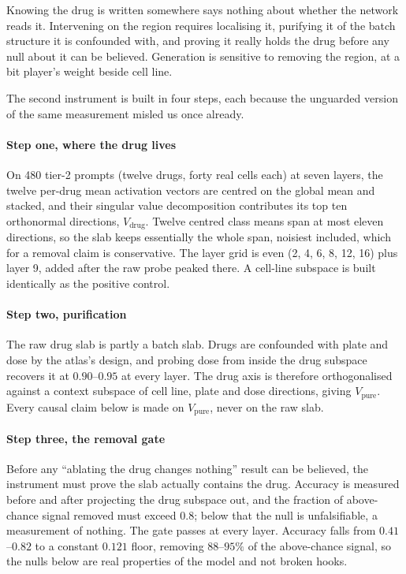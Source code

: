 \begin{question}[3]
Knowing the drug is written somewhere says nothing about whether the network
reads it. Intervening on the region requires localising it, purifying it of the
batch structure it is confounded with, and proving it really holds the drug
before any null about it can be believed. Generation is sensitive to removing the
region, at a bit player's weight beside cell line.
\end{question}

\noindent
The second instrument is built in four steps, each because the unguarded version
of the same measurement misled us once already.

\paragraph{Step one, where the drug lives} On \num{480} tier-2 prompts (twelve
drugs, forty real cells each) at seven layers, the twelve per-drug mean
activation vectors are centred on the global mean and stacked, and their singular
value decomposition contributes its top ten orthonormal directions,
$V_{\textrm{drug}}$. Twelve centred class means span at most eleven directions,
so the slab keeps essentially the whole span, noisiest included, which for a
removal claim is conservative. The layer grid is even (2, 4, 6, 8, 12, 16) plus
layer 9, added after the raw probe peaked there. A cell-line subspace is built
identically as the positive control.

\paragraph{Step two, purification} The raw drug slab is partly a batch slab.
Drugs are confounded with plate and dose by the atlas's design, and probing dose
from inside the drug subspace recovers it at $0.90$--$0.95$ at every layer. The
drug axis is therefore orthogonalised against a context subspace of cell line,
plate and dose directions, giving $V_{\textrm{pure}}$. Every causal claim below
is made on $V_{\textrm{pure}}$, never on the raw slab.

\paragraph{Step three, the removal gate} Before any ``ablating the drug changes
nothing'' result can be believed, the instrument must prove the slab actually
contains the drug. Accuracy is measured before and after projecting the drug
subspace out, and the fraction of above-chance signal removed must exceed $0.8$;
below that the null is unfalsifiable, a measurement of nothing. The gate passes
at every layer. Accuracy falls from $0.41$--$0.82$ to a constant $0.121$ floor,
removing $88$--$95\%$ of the above-chance signal, so the nulls below are real
properties of the model and not broken hooks.

